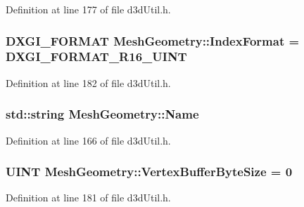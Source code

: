 Definition at line 177 of file d3d\+Util.\+h.

\subsubsection[{\texorpdfstring{Index\+Format}{IndexFormat}}]{\setlength{\rightskip}{0pt plus 5cm}D\+X\+G\+I\+\_\+\+F\+O\+R\+M\+AT Mesh\+Geometry\+::\+Index\+Format = D\+X\+G\+I\+\_\+\+F\+O\+R\+M\+A\+T\+\_\+\+R16\+\_\+\+U\+I\+NT}\hypertarget{struct_mesh_geometry_a4ab6fed21b08b6008850e43f8e912506_a4ab6fed21b08b6008850e43f8e912506}{}\label{struct_mesh_geometry_a4ab6fed21b08b6008850e43f8e912506_a4ab6fed21b08b6008850e43f8e912506}


Definition at line 182 of file d3d\+Util.\+h.

\subsubsection[{\texorpdfstring{Name}{Name}}]{\setlength{\rightskip}{0pt plus 5cm}std\+::string Mesh\+Geometry\+::\+Name}\hypertarget{struct_mesh_geometry_a9cfdc0d2b907a9059b32fccae59d9813_a9cfdc0d2b907a9059b32fccae59d9813}{}\label{struct_mesh_geometry_a9cfdc0d2b907a9059b32fccae59d9813_a9cfdc0d2b907a9059b32fccae59d9813}


Definition at line 166 of file d3d\+Util.\+h.

\subsubsection[{\texorpdfstring{Vertex\+Buffer\+Byte\+Size}{VertexBufferByteSize}}]{\setlength{\rightskip}{0pt plus 5cm}U\+I\+NT Mesh\+Geometry\+::\+Vertex\+Buffer\+Byte\+Size = 0}\hypertarget{struct_mesh_geometry_a95d475544535050a64a841489a0e3269_a95d475544535050a64a841489a0e3269}{}\label{struct_mesh_geometry_a95d475544535050a64a841489a0e3269_a95d475544535050a64a841489a0e3269}


Definition at line 181 of file d3d\+Util.\+h.

